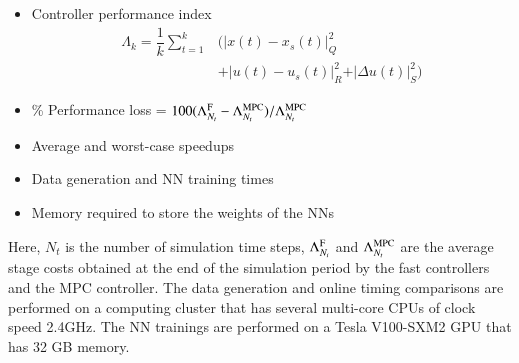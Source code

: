 \documentclass[preprint,5p, twocolumn, authoryear]{elsarticle}
\begin{document}
\begin{itemize}
    \item Controller performance index
    \begin{align*}        
    \Lambda_k = \dfrac{1}{k}\sum_{t=1}^{k} & \big(\vert x(t) - x_{s} (t) \vert^2_{Q} \\
        & + \vert u(t) - u_{s} (t) \vert^2_{R} + \vert \Delta u(t) \vert^2_{S}\big)         
    \end{align*}
    \item \% Performance loss = $100(\Lambda^{\textnormal{F}}_{N_{t}} - \Lambda^{\textnormal{MPC}}_{N_{t}})/\Lambda^{\textnormal{MPC}}_{N_{t}}$
    \item Average and worst-case speedups
    \item Data generation and NN training times
    \item Memory required to store the weights of the NNs
\end{itemize}
Here, $N_t$ is the number of simulation time steps,  
$\Lambda^{\textnormal{F}}_{N_{t}}$ and 
$\Lambda^{\textnormal{MPC}}_{N_{t}}$
are the average stage costs obtained 
at the end of the simulation period by the 
fast controllers and the MPC controller.
The data generation and online timing comparisons are 
performed on a computing cluster that has 
several multi-core CPUs of clock speed 2.4GHz. 
The NN trainings are performed on a 
Tesla V100-SXM2 GPU that has 32 GB memory.
\end{document}
